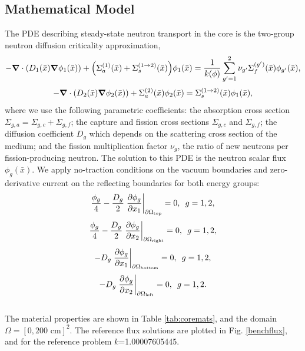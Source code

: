 \documentclass{mc2015}
\newcommand{\xs}[2]{\ensuremath{\Sigma_{#1}^{(#2)}}}
\begin{document}
\subsection{Mathematical Model}
The PDE describing steady-state neutron transport in the core is the two-group neutron diffusion criticality approximation,
\begin{equation}
-\grad\cdot\qty( D_1(\bar x)\grad\phi_1(\bar x))+\qty(\xs{a}{1}(\bar x)+\xs{s}{1\to2}(\bar x))\phi_1(\bar x) = \frac{1}{k(\phi)}\sum_{g'=1}^2\nu_{g'}\xs{f}{g'}(\bar x)\phi_{g'}(\bar x),
\end{equation}
\begin{equation}
-\grad \cdot\qty(D_2(\bar x)\grad \phi_2(\bar x))+\xs{a}{2}(\bar x)\phi_2(\bar x) = \xs{s}{1\to 2}(\bar x)\phi_1(\bar x),
\end{equation}
where we use the following parametric coefficients: the absorption cross section $\Sigma_{g,a}=\Sigma_{g,c}+\Sigma_{g,f}$; the capture and fission cross sections $\Sigma_{g,c}$ and $\Sigma_{g,f}$; the diffusion coefficient $D_g$ which depends on the scattering cross section of the medium; and the fission multiplication factor $\nu_g$, the ratio of new neutrons per fission-producing neutron.  The solution to this PDE is the neutron scalar flux $\phi_g(\bar x)$.  We apply no-traction conditions on the vacuum boundaries and zero-derivative current on the reflecting boundaries for both energy groups:
 \begin{equation}
\frac{\phi_g}{4}-\frac{D_g}{2}\eval{\pdv{\phi_g}{x_1}}_{\partial \Omega_\text{top}}=0,\hspace{5pt} g=1,2,
\end{equation}
\begin{equation}
\frac{\phi_g}{4}-\frac{D_g}{2}\eval{\pdv{\phi_g}{x_2}}_{\partial \Omega_\text{right}}=0,\hspace{5pt} g=1,2,
\end{equation}
\begin{equation}
-D_g\eval{\pdv{\phi_g}{x_1}}_{\partial \Omega_\text{bottom}}=0,\hspace{5pt} g=1,2,
\end{equation}
\begin{equation}
-D_g\eval{\pdv{\phi_g}{x_2}}_{\partial \Omega_\text{left}}=0,\hspace{5pt} g=1,2.
\end{equation}
\\

The material properties are shown in Table \ref{tab:coremats}, and the domain $\Omega=[0,200\text{ cm}]^2$.  The reference flux solutions are plotted in Fig. \ref{benchflux}, and for the reference problem $k$=1.00007605445.
\end{document}
